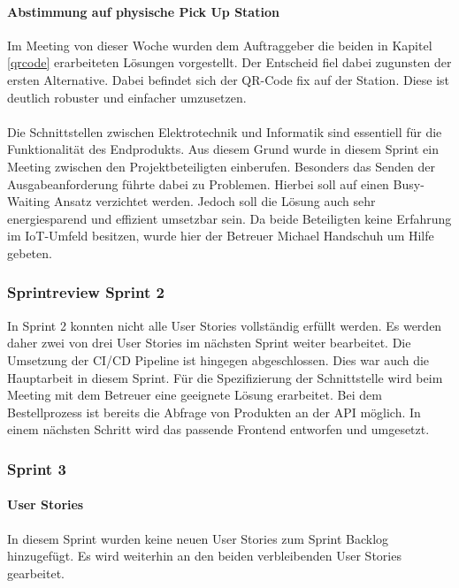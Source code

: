 \paragraph{Abstimmung auf physische Pick Up Station}
Im Meeting von dieser Woche wurden dem Auftraggeber die beiden in Kapitel \ref{qrcode} erarbeiteten Lösungen vorgestellt. Der Entscheid fiel dabei zugunsten der ersten Alternative. Dabei befindet sich der QR-Code fix auf der Station. Diese ist deutlich robuster und einfacher umzusetzen. \\\\
Die Schnittstellen zwischen Elektrotechnik und Informatik sind essentiell für die Funktionalität des Endprodukts. Aus diesem Grund wurde in diesem Sprint ein Meeting zwischen den Projektbeteiligten einberufen. Besonders das Senden der Ausgabeanforderung führte dabei zu Problemen. Hierbei soll auf einen Busy-Waiting Ansatz verzichtet werden. Jedoch soll die Lösung auch sehr energiesparend und effizient umsetzbar sein. Da beide Beteiligten keine Erfahrung im \ac{IoT}-Umfeld besitzen, wurde hier der Betreuer Michael Handschuh um Hilfe gebeten. 


\subsubsection{Sprintreview Sprint 2}
In Sprint 2 konnten nicht alle User Stories vollständig erfüllt werden. Es werden daher zwei von drei User Stories im nächsten Sprint weiter bearbeitet. Die Umsetzung der CI/CD Pipeline ist hingegen abgeschlossen. Dies war auch die Hauptarbeit in diesem Sprint. Für die Spezifizierung der Schnittstelle wird beim Meeting mit dem Betreuer eine geeignete Lösung erarbeitet. Bei dem Bestellprozess ist bereits die Abfrage von Produkten an der API möglich. In einem nächsten Schritt wird das passende Frontend entworfen und umgesetzt. 

\subsubsection{Sprint 3}
\paragraph{User Stories}
In diesem Sprint wurden keine neuen User Stories zum Sprint Backlog hinzugefügt. Es wird weiterhin an den beiden verbleibenden User Stories gearbeitet. 

\newpage
